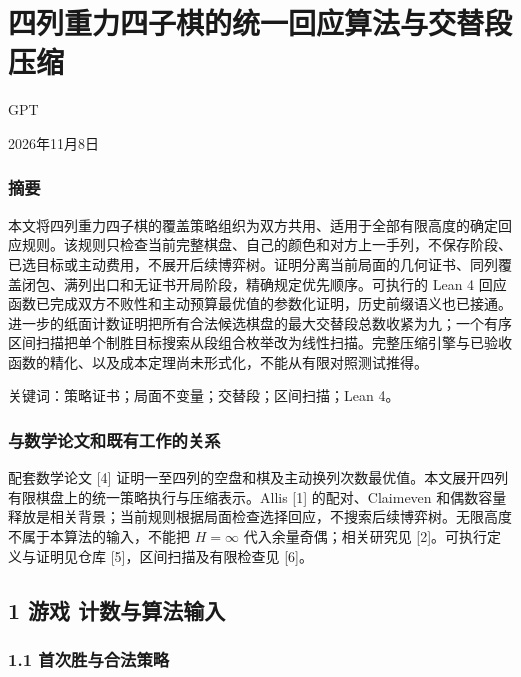 \documentclass[
  a4paper,
]{article}
\author{GPT}
\date{}
\begin{document}
\section{四列重力四子棋的统一回应算法与交替段压缩}\label{ux56dbux5217ux91cdux529bux56dbux5b50ux68cbux7684ux7edfux4e00ux56deux5e94ux7b97ux6cd5ux4e0eux4ea4ux66ffux6bb5ux538bux7f29}

GPT

2026年11月8日

\subsubsection{摘要}\label{ux6458ux8981}

本文将四列重力四子棋的覆盖策略组织为双方共用、适用于全部有限高度的确定回应规则。该规则只检查当前完整棋盘、自己的颜色和对方上一手列，不保存阶段、已选目标或主动费用，不展开后续博弈树。证明分离当前局面的几何证书、同列覆盖闭包、满列出口和无证书开局阶段，精确规定优先顺序。可执行的
Lean 4
回应函数已完成双方不败性和主动预算最优值的参数化证明，历史前缀语义也已接通。进一步的纸面计数证明把所有合法候选棋盘的最大交替段总数收紧为九；一个有序区间扫描把单个制胜目标搜索从段组合枚举改为线性扫描。完整压缩引擎与已验收函数的精化、以及成本定理尚未形式化，不能从有限对照测试推得。

关键词：策略证书；局面不变量；交替段；区间扫描；Lean 4。

\subsubsection{与数学论文和既有工作的关系}\label{ux4e0eux6570ux5b66ux8bbaux6587ux548cux65e2ux6709ux5de5ux4f5cux7684ux5173ux7cfb}

配套数学论文 {[}4{]}
证明一至四列的空盘和棋及主动换列次数最优值。本文展开四列有限棋盘上的统一策略执行与压缩表示。Allis
{[}1{]} 的配对、Claimeven
和偶数容量释放是相关背景；当前规则根据局面检查选择回应，不搜索后续博弈树。无限高度不属于本算法的输入，不能把
\(H=\infty\) 代入余量奇偶；相关研究见 {[}2{]}。可执行定义与证明见仓库
{[}5{]}，区间扫描及有限检查见 {[}6{]}。

\subsection{1 游戏
计数与算法输入}\label{ux6e38ux620f-ux8ba1ux6570ux4e0eux7b97ux6cd5ux8f93ux5165}

\subsubsection{1.1
首次胜与合法策略}\label{ux9996ux6b21ux80dcux4e0eux5408ux6cd5ux7b56ux7565}
\end{document}
